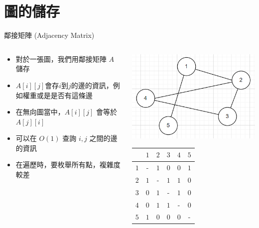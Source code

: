 \documentclass[aspectratio=169]{beamer}
\begin{document}
    \section{圖的儲存}
    
    \begin{frame}{鄰接矩陣 (Adjacency Matrix)}
    \begin{columns}
    \begin{column}{0.6\textwidth}
        \begin{itemize}
            \item 對於一張圖，我們用鄰接矩陣 $A$ 儲存
            \item $A[i][j]$會存$i$到$j$的邊的資訊，例如權重或是是否有這條邊
            \item 在無向圖當中，$A[i][j]$ 會等於 $A[j][i]$
            \item 可以在 $O(1)$ 查詢 $i,j$ 之間的邊的資訊
            \item 在遍歷時，要枚舉所有點，複雜度較差
        \end{itemize}
    \end{column}
    \begin{column}{0.4\textwidth}
        \begin{center}
            \includegraphics[scale=0.3]{images/Adjacency Matrix.png}
        \end{center}
        \begin{center}
        \begin{tabular}{|c|c|c|c|c|c|}
            \hline
                  & $1$ & $2$ & $3$ & $4$ & $5$  \\ \hline 
             $1$  &  -  & $1$ & $0$ & $0$ & $1$  \\ \hline
             $2$  & $1$ &  -  & $1$ & $1$ & $0$   \\ \hline
             $3$  & $0$ & $1$ &  -  & $1$ & $0$  \\ \hline
             $4$  & $0$ & $1$ & $1$ &  -  & $0$  \\ \hline
             $5$  & $1$ & $0$ & $0$ & $0$ &  -  \\ \hline
        \end{tabular}
        \end{center}
    \end{column}
    \end{columns}
    \end{frame}
    
\end{document}
